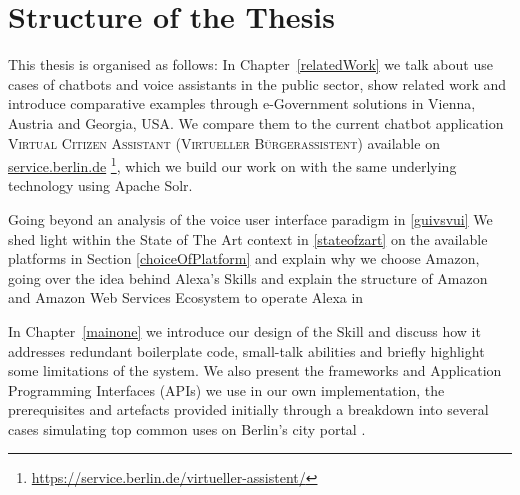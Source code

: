 \section{Structure of the Thesis}
%

This thesis is organised as follows:
In Chapter~\ref{relatedWork} %
we talk about use cases of chatbots and voice assistants in the public sector, 
show related work 
and introduce comparative examples
through e-Government solutions in
Vienna, Austria and Georgia, USA.
We compare them to the current chatbot application \textsc{Virtual Citizen Assistant (Virtueller Bürgerassistent)} available on \href{https://service.berlin.de/virtueller-assistent/virtueller-assistent-606279.php}{service.berlin.de} \footnote{\url{https://service.berlin.de/virtueller-assistent/}}, which we build our work on with the same underlying technology using Apache Solr.

%

Going beyond an analysis of the voice user interface paradigm in 
 \ref{guivsvui}
We shed light within the State of The Art context in 
 \ref{stateofzart} 
on the available platforms in Section \ref{choiceOfPlatform} and explain why we choose Amazon, going over the idea behind Alexa's Skills
and explain the structure of Amazon and Amazon Web Services Ecosystem to operate Alexa in 

%
%
%
%
%


In Chapter~\ref{mainone} we introduce our design of the Skill and discuss how it 
addresses
redundant boilerplate code, small-talk abilities and briefly highlight some limitations of the system. We also present the frameworks and Application Programming Interfaces (APIs) we use in our own implementation, the prerequisites and artefacts provided initially through a breakdown into several cases simulating top common uses on Berlin's city portal .


